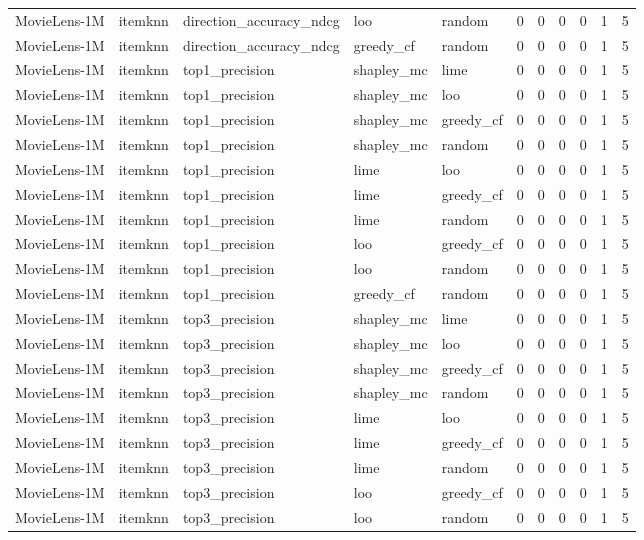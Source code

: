 \begin{table}[t]
{\begin{tabular}{lllllrrrrrr}
MovieLens-1M & itemknn & direction\_accuracy\_ndcg & loo & random & 0 & 0 & 0 & 0 & 1 & 5 \\
MovieLens-1M & itemknn & direction\_accuracy\_ndcg & greedy\_cf & random & 0 & 0 & 0 & 0 & 1 & 5 \\
MovieLens-1M & itemknn & top1\_precision & shapley\_mc & lime & 0 & 0 & 0 & 0 & 1 & 5 \\
MovieLens-1M & itemknn & top1\_precision & shapley\_mc & loo & 0 & 0 & 0 & 0 & 1 & 5 \\
MovieLens-1M & itemknn & top1\_precision & shapley\_mc & greedy\_cf & 0 & 0 & 0 & 0 & 1 & 5 \\
MovieLens-1M & itemknn & top1\_precision & shapley\_mc & random & 0 & 0 & 0 & 0 & 1 & 5 \\
MovieLens-1M & itemknn & top1\_precision & lime & loo & 0 & 0 & 0 & 0 & 1 & 5 \\
MovieLens-1M & itemknn & top1\_precision & lime & greedy\_cf & 0 & 0 & 0 & 0 & 1 & 5 \\
MovieLens-1M & itemknn & top1\_precision & lime & random & 0 & 0 & 0 & 0 & 1 & 5 \\
MovieLens-1M & itemknn & top1\_precision & loo & greedy\_cf & 0 & 0 & 0 & 0 & 1 & 5 \\
MovieLens-1M & itemknn & top1\_precision & loo & random & 0 & 0 & 0 & 0 & 1 & 5 \\
MovieLens-1M & itemknn & top1\_precision & greedy\_cf & random & 0 & 0 & 0 & 0 & 1 & 5 \\
MovieLens-1M & itemknn & top3\_precision & shapley\_mc & lime & 0 & 0 & 0 & 0 & 1 & 5 \\
MovieLens-1M & itemknn & top3\_precision & shapley\_mc & loo & 0 & 0 & 0 & 0 & 1 & 5 \\
MovieLens-1M & itemknn & top3\_precision & shapley\_mc & greedy\_cf & 0 & 0 & 0 & 0 & 1 & 5 \\
MovieLens-1M & itemknn & top3\_precision & shapley\_mc & random & 0 & 0 & 0 & 0 & 1 & 5 \\
MovieLens-1M & itemknn & top3\_precision & lime & loo & 0 & 0 & 0 & 0 & 1 & 5 \\
MovieLens-1M & itemknn & top3\_precision & lime & greedy\_cf & 0 & 0 & 0 & 0 & 1 & 5 \\
MovieLens-1M & itemknn & top3\_precision & lime & random & 0 & 0 & 0 & 0 & 1 & 5 \\
MovieLens-1M & itemknn & top3\_precision & loo & greedy\_cf & 0 & 0 & 0 & 0 & 1 & 5 \\
MovieLens-1M & itemknn & top3\_precision & loo & random & 0 & 0 & 0 & 0 & 1 & 5 \\

\end{tabular}}
\end{table}

